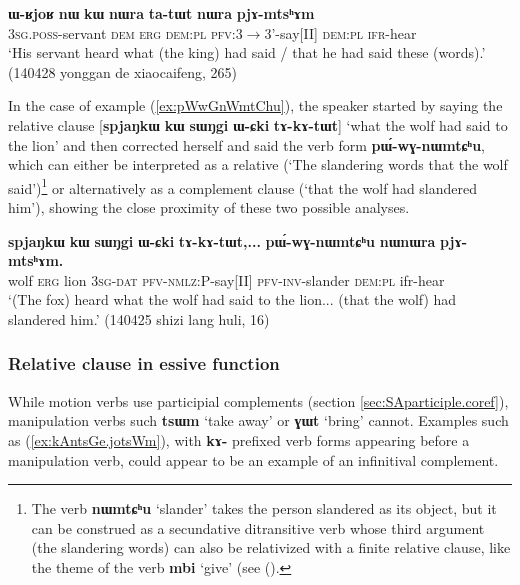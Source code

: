\documentclass[oneside,a4paper,11pt]{article}
\newcommand{\ipa}[1]{\textbf{\phon#1}} %
\newcommand{\jpg}[2]{\ipa{#1} `#2'} %
\begin{document}
\begin{exe}
\ex \label{ex:tatWt.nWra}
\gll \ipa{ɯ-ʁjoʁ} 	\ipa{nɯ} 	\ipa{kɯ} 	\ipa{nɯra} 	\ipa{ta-tɯt} 	\ipa{nɯra} 	\ipa{pjɤ-mtsʰɤm} \\
\textsc{3sg.poss}-servant \textsc{dem} \textsc{erg} \textsc{dem:pl} \textsc{pfv}:3$\rightarrow$3'-say[II] \textsc{dem:pl}  \textsc{ifr}-hear \\
\glt `His servant heard what (the king) had said / that he had said these (words).' (140428 yonggan de xiaocaifeng, 265)
\end{exe}

In the case of example (\ref{ex:pWwGnWmtChu}), the speaker started by saying the relative clause [\ipa{spjaŋkɯ} \ipa{kɯ} \ipa{sɯŋgi} \ipa{ɯ-ɕki} \ipa{tɤ-kɤ-tɯt}] `what the wolf had said to the lion' and then corrected herself and said the verb form \ipa{pɯ́-wɣ-nɯmtɕʰu}, which can either be interpreted as a relative (`The slandering words that the wolf said')\footnote{The verb \jpg{nɯmtɕʰu}{slander} takes the person slandered as its object, but it can be construed as a secundative ditransitive verb whose third argument (the slandering words) can also be relativized with a finite relative clause, like the theme of the verb \jpg{mbi}{give} (see (\citealt[16-17]{jacques16relatives}).} or alternatively as a complement clause (`that the wolf had slandered him'), showing the close proximity of these two possible analyses.

\begin{exe}
\ex \label{ex:pWwGnWmtChu}
\gll 
\ipa{spjaŋkɯ} 	\ipa{kɯ} 	\ipa{sɯŋgi} 	\ipa{ɯ-ɕki} 	\ipa{tɤ-kɤ-tɯt,...} 	\ipa{pɯ́-wɣ-nɯmtɕʰu} 	\ipa{nɯnɯra} 	\ipa{pjɤ-mtsʰɤm.} \\
wolf \textsc{erg} lion \textsc{3sg-dat} \textsc{pfv-nmlz:P}-say[II] \textsc{pfv-inv}-slander \textsc{dem:pl} ifr-hear \\
\glt `(The fox) heard what the wolf had said to the lion... (that the wolf) had slandered him.' (140425 shizi lang huli, 16)
\end{exe}

\subsubsection{Relative clause in essive function} \label{sec:essive}
While motion verbs use participial complements (section \ref{sec:SAparticiple.coref}), manipulation verbs such \jpg{tsɯm}{take away} or \jpg{ɣɯt}{bring} cannot. Examples such as (\ref{ex:kAntsGe.jotsWm}), with \ipa{kɤ-} prefixed verb forms appearing before a manipulation verb, could appear to be an example of an infinitival complement.
\end{document}
